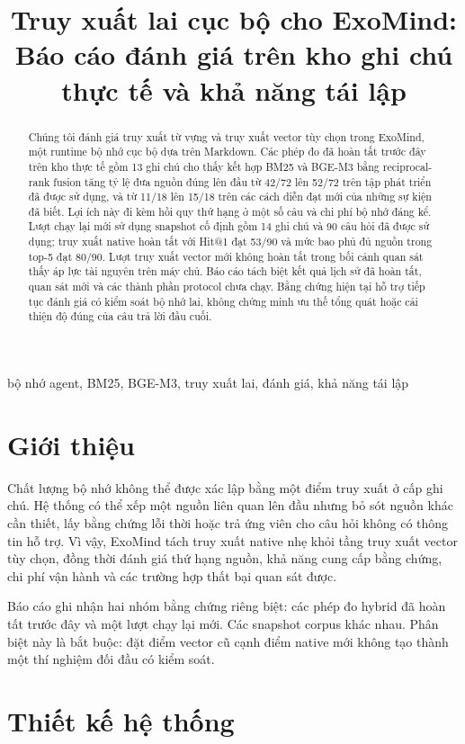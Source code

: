 \documentclass[conference]{IEEEtran}
\title{Truy xuất lai cục bộ cho ExoMind:\\Báo cáo đánh giá trên kho ghi chú thực tế và khả năng tái lập}
\author{\IEEEauthorblockN{ExoMind Project}\IEEEauthorblockA{Báo cáo nghiên cứu nội bộ\\Không phải công bố IEEE đã qua phản biện}}
\begin{document}
\maketitle
\begin{abstract}
Chúng tôi đánh giá truy xuất từ vựng và truy xuất vector tùy chọn trong ExoMind, một runtime bộ nhớ cục bộ dựa trên Markdown. Các phép đo đã hoàn tất trước đây trên kho thực tế gồm 13 ghi chú cho thấy kết hợp BM25 và BGE-M3 bằng reciprocal-rank fusion tăng tỷ lệ đưa nguồn đúng lên đầu từ 42/72 lên 52/72 trên tập phát triển đã được sử dụng, và từ 11/18 lên 15/18 trên các cách diễn đạt mới của những sự kiện đã biết. Lợi ích này đi kèm hồi quy thứ hạng ở một số câu và chi phí bộ nhớ đáng kể. Lượt chạy lại mới sử dụng snapshot cố định gồm 14 ghi chú và 90 câu hỏi đã được sử dụng; truy xuất native hoàn tất với Hit@1 đạt 53/90 và mức bao phủ đủ nguồn trong top-5 đạt 80/90. Lượt truy xuất vector mới không hoàn tất trong bối cảnh quan sát thấy áp lực tài nguyên trên máy chủ. Báo cáo tách biệt kết quả lịch sử đã hoàn tất, quan sát mới và các thành phần protocol chưa chạy. Bằng chứng hiện tại hỗ trợ tiếp tục đánh giá có kiểm soát bộ nhớ lai, không chứng minh ưu thế tổng quát hoặc cải thiện độ đúng của câu trả lời đầu cuối.
\end{abstract}
\begin{IEEEkeywords}
bộ nhớ agent, BM25, BGE-M3, truy xuất lai, đánh giá, khả năng tái lập
\end{IEEEkeywords}

\section{Giới thiệu}
Chất lượng bộ nhớ không thể được xác lập bằng một điểm truy xuất ở cấp ghi chú. Hệ thống có thể xếp một nguồn liên quan lên đầu nhưng bỏ sót nguồn khác cần thiết, lấy bằng chứng lỗi thời hoặc trả ứng viên cho câu hỏi không có thông tin hỗ trợ. Vì vậy, ExoMind tách truy xuất native nhẹ khỏi tầng truy xuất vector tùy chọn, đồng thời đánh giá thứ hạng nguồn, khả năng cung cấp bằng chứng, chi phí vận hành và các trường hợp thất bại quan sát được.

Báo cáo ghi nhận hai nhóm bằng chứng riêng biệt: các phép đo hybrid đã hoàn tất trước đây và một lượt chạy lại mới. Các snapshot corpus khác nhau. Phân biệt này là bắt buộc: đặt điểm vector cũ cạnh điểm native mới không tạo thành một thí nghiệm đối đầu có kiểm soát.

\section{Thiết kế hệ thống}
\end{document}
